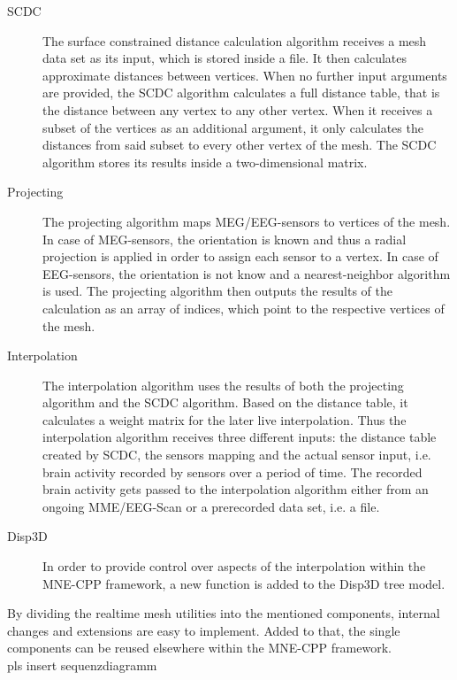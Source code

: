 \documentclass[a4paper, 11pt, english, fleqn]{article}
\begin{document}
\begin{description}
	
	\item[SCDC] 
	The surface constrained distance calculation algorithm receives a mesh data set as its input, which is stored inside a file. It then calculates approximate distances between vertices. When no further input arguments are provided, the SCDC algorithm calculates a full distance table, that is the distance between any vertex to any other vertex.
	When it receives a subset of the vertices as an additional argument, it only calculates the distances from said subset to every other vertex of the mesh. The SCDC algorithm stores its results inside a two-dimensional matrix.
	
	\item[Projecting]
	The projecting algorithm maps MEG/EEG-sensors to vertices of the mesh. In case of MEG-sensors, the orientation is known and thus a radial projection is applied in order to assign each sensor to a vertex. In case of EEG-sensors, the orientation is not know and a nearest-neighbor algorithm is used.
	The projecting algorithm then outputs the results of the calculation as an array of indices, which point to the respective vertices of the mesh.
	
	\item[Interpolation]
	The interpolation algorithm uses the results of both the projecting algorithm and the SCDC algorithm.
	Based on the distance table, it calculates a weight matrix for the later live interpolation. 
	Thus the interpolation algorithm receives three different inputs: the distance table created by SCDC, the sensors mapping and the actual sensor input, i.e. brain activity recorded by sensors over a period of time.
	The recorded brain activity gets passed to the interpolation algorithm either from an ongoing MME/EEG-Scan or a prerecorded data set, i.e. a file. 
	
	\item[Disp3D]
	In order to provide control over aspects of the interpolation within the MNE-CPP framework, a new function is added to the Disp3D tree model.
		
\end{description}

By dividing the realtime mesh utilities into the mentioned components, internal changes and extensions are easy to implement. Added to that, the single components can be reused elsewhere within the MNE-CPP framework.
\\

{pls insert sequenzdiagramm}

\clearpage
  
\end{document}
